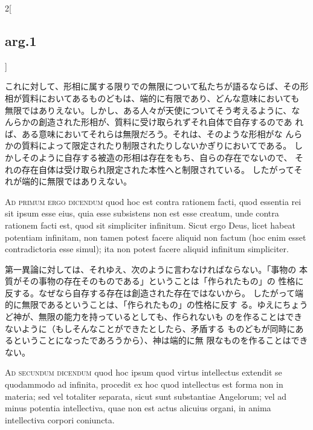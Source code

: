 \documentclass[paper=a4paper,fontsize=10pt,jafontsize=9pt,titlepage]{jlreq}
\begin{document}
\begin{paracol}{2}[\subsection{arg.1}]
\switchcolumn

これに対して、形相に属する限りでの無限について私たちが語るならば、その形
 相が質料においてあるものどもは、端的に有限であり、どんな意味においても
 無限ではありえない。しかし、ある人々が天使についてそう考えるように、な
 んらかの創造された形相が、質料に受け取られずそれ自体で自存するのであ
 れば、ある意味においてそれらは無限だろう。それは、そのような形相がな
 んらかの質料によって限定されたり制限されたりしないかぎりにおいてである。
 しかしそのように自存する被造の形相は存在をもち、自らの存在でないので、
それの存在自体は受け取られ限定された本性へと制限されている。
 したがってそれが端的に無限ではありえない。

\switchcolumn*[\subsection{ad.1}]

{\scshape Ad primum ergo dicendum} quod hoc est contra rationem facti, quod
essentia rei sit ipsum esse eius, quia esse subsistens non est esse
creatum, unde contra rationem facti est, quod sit simpliciter
infinitum. Sicut ergo Deus, licet habeat potentiam infinitam, non tamen
potest facere aliquid non factum (hoc enim esset contradictoria esse
simul); ita non potest facere aliquid infinitum simpliciter.

\switchcolumn

第一異論に対しては、それゆえ、次のように言わなければならない。「事物の
 本質がその事物の存在そのものである」ということは「作られたもの」の
性格に反する。なぜなら自存する存在は創造された存在ではないから。
 したがって端的に無限であるということは、「作られたもの」の性格に反す
 る。ゆえにちょうど神が、無限の能力を持っているとしても、作られないも
 のを作ることはできないように（もしそんなことができたとしたら、矛盾する
 ものどもが同時にあるということになったであろうから）、神は端的に無
 限なものを作ることはできない。

\switchcolumn*[\subsection{ad.2}]

{\scshape Ad secundum dicendum} quod hoc ipsum quod virtus intellectus extendit se
quodammodo ad infinita, procedit ex hoc quod intellectus est forma non
in materia; sed vel totaliter separata, sicut sunt substantiae
Angelorum; vel ad minus potentia intellectiva, quae non est actus
alicuius organi, in anima intellectiva corpori coniuncta.


\end{paracol}
\end{document}
